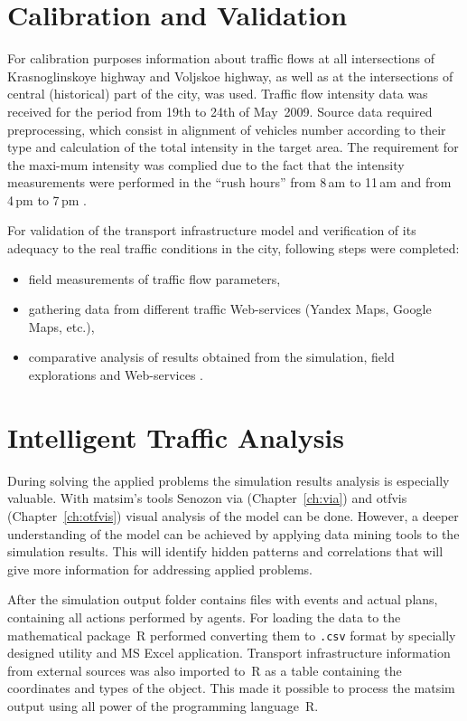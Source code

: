 \section{Calibration and Validation}
For calibration purposes information about traffic flows at all intersections of Krasnoglinskoye highway and Voljskoe highway, as well as at the intersections of central (historical) part of the city, was used. Traffic flow intensity data was received for the period from 19th to 24th of May~2009. Source data required preprocessing, which consist in alignment of vehicles number according to their type and calculation of the total intensity in the target area. The requirement for the maxi-mum intensity was complied due to the fact that the intensity measurements were performed in the ``rush hours'' from 8\,am to 11\,am and from 4\,pm to 7\,pm \citep[][]{Mikheeva_2008}. 

For validation of the transport infrastructure model and verification of its adequacy to the real traffic conditions in the city, following steps were completed: 
\begin{itemize}
\item field measurements of traffic flow parameters,
\item gathering data from different traffic Web-services (Yandex Maps, Google Maps, etc.),
\item comparative analysis of results obtained from the simulation, field explorations and Web-services \citep[][]{SaprykinaEtAl_2014}.
\end{itemize}

\section{Intelligent Traffic Analysis}
During solving the applied problems the simulation results analysis is especially valuable. 
With \gls{matsim}'s tools Senozon \gls{via} (Chapter~\ref{ch:via}) and \gls{otfvis} (Chapter~\ref{ch:otfvis}) visual analysis of the model can be done. 
However, a deeper understanding of the model can be achieved by applying data mining tools to the simulation results. 
This will identify hidden patterns and correlations that will give more information for addressing applied problems. 

After the simulation output folder contains files with events and actual plans, containing all actions performed by agents. For loading the data to the mathematical package~R performed converting them to \lstinline|.csv| format by specially designed utility and MS Excel application. Transport infrastructure information from external sources was also imported to~R as a table containing the coordinates and types of the object. This made it possible to process the \gls{matsim} output using all power of the programming language~R.


